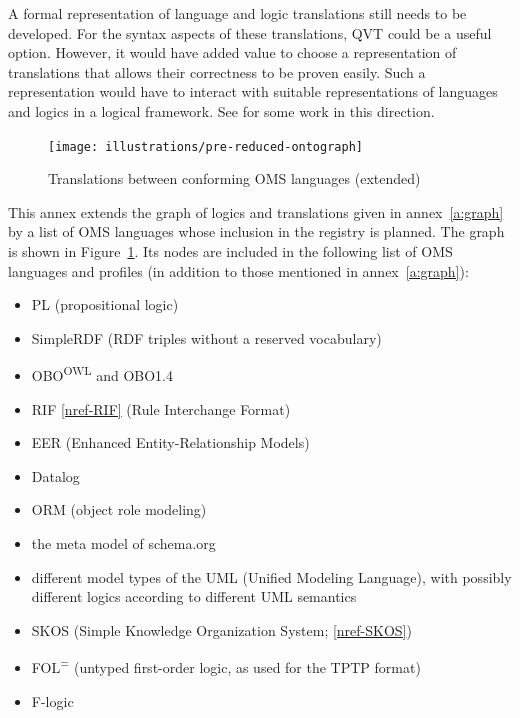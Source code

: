 \documentclass[10pt, a4paper]{isov2}
\renewcommand{\annexrefname}{annex}
\renewcommand{\figurerefname}{Figure}
\renewcommand{\noterefname}{note}
\renewcommand{\aref}[1]{\annexrefname~\ref{#1}}
\renewcommand{\fref}[1]{\figurerefname~\ref{#1}}
\renewcommand{\nref}[1]{\noterefname~\ref{#1}}
\renewcommand{\nref}[1]{\ref{nref-#1}}
\begin{document}
A formal representation of language and logic translations still needs
to be developed. For the syntax aspects of these translations, QVT
could be a useful option. However, it would have added value to choose
a representation of translations that allows  their correctness
to be proven easily. Such a representation would have to interact
with suitable representations of languages and logics in a 
logical framework. See \cite{CodescuEtAl2011d} for some work
in this direction.


\cleardoublepage
{}\label{a:ext-graph}

\begin{figure}
  \centering
  \texttt{[image: illustrations/pre-reduced-ontograph]}
  \caption{Translations between conforming OMS languages (extended)}
  \label{fig:pre-ontograph}
\end{figure}
This annex extends the graph of logics and translations given in
\aref{a:graph} by a list of OMS languages  whose inclusion in
the registry is planned.  The graph is shown in
\fref{fig:pre-ontograph}.  Its nodes are included in the following
list of OMS languages and profiles (in addition to those
mentioned in \aref{a:graph}):
\begin{itemize}
\item PL (propositional logic)
\item SimpleRDF (RDF triples without a reserved vocabulary)
\item OBO\textsuperscript{OWL} and OBO1.4
\item RIF \nref{RIF} (Rule Interchange Format)
\item EER (Enhanced Entity-Relationship Models) %
\item Datalog
\item ORM (object role modeling)
\item the meta model of schema.org
\item different model types of the UML (Unified Modeling Language), with possibly different logics according to different
UML semantics
\item SKOS (Simple Knowledge Organization System; \nref{SKOS})
\item FOL\textsuperscript{=} (untyped first-order logic, as used for the
TPTP format)
\item F-logic
\end{itemize}
\end{document}
